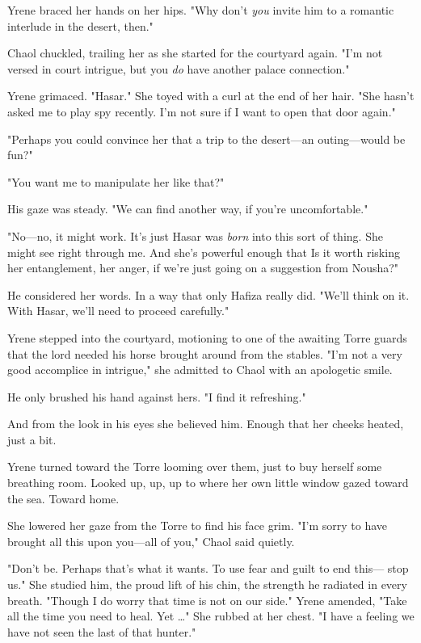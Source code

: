 Yrene braced her hands on her hips. "Why don't \emph{you} invite him to a romantic interlude in the desert, then."

Chaol chuckled, trailing her as she started for the courtyard again. "I'm not versed in court intrigue, but you \emph{do} have another palace connection."

Yrene grimaced. "Hasar." She toyed with a curl at the end of her hair. "She hasn't asked me to play spy recently. I'm not sure if I want to
 open that door again."

"Perhaps you could convince her that a trip to the desert---an outing---would be  fun?"

"You want me to manipulate her like that?"

His gaze was steady. "We can find another way, if you're uncomfortable."

"No---no, it might work. It's just Hasar was \emph{born} into this sort of thing. She might see right through me. And she's powerful enough that
 Is it worth risking her entanglement, her anger, if we're just going on a suggestion from Nousha?"

He considered her words. In a way that only Hafiza really did. "We'll think on it. With Hasar, we'll need to proceed carefully."

Yrene stepped into the courtyard, motioning to one of the awaiting Torre guards that the lord needed his horse brought around from the stables. "I'm not a very good accomplice in intrigue," she admitted to Chaol with an apologetic smile.

He only brushed his hand against hers. "I find it refreshing."

And from the look in his eyes  she believed him. Enough that her cheeks heated, just a bit.

Yrene turned toward the Torre looming over them, just to buy herself some breathing room. Looked up, up, up to where her own little window gazed toward the sea. Toward home.

She lowered her gaze from the Torre to find his face grim. "I'm sorry to have brought all this upon you---all of you," Chaol said quietly.

"Don't be. Perhaps that's what it wants. To use fear and guilt to end this--- stop us." She studied him, the proud lift of his chin, the strength he radiated in every breath. "Though  I do worry that time is not on our side." Yrene amended, "Take all the time you need to heal. Yet \ldots" She rubbed at her chest. "I have a feeling we have not seen the last of that hunter."

